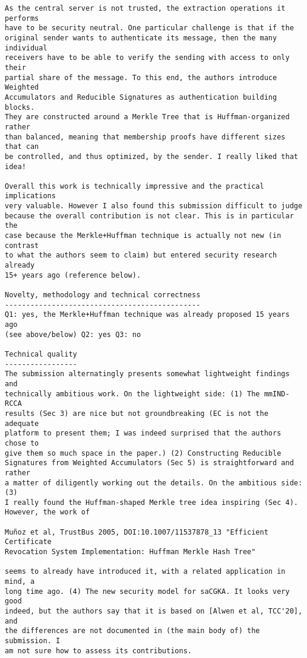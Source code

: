 \documentclass[letterpaper,10pt]{article}
\begin{document}
\begin{enumerate}[label=(\Alph*)]
\begin{verbatim}
As the central server is not trusted, the extraction operations it performs
have to be security neutral. One particular challenge is that if the
original sender wants to authenticate its message, then the many individual
receivers have to be able to verify the sending with access to only their
partial share of the message. To this end, the authors introduce Weighted
Accumulators and Reducible Signatures as authentication building blocks.
They are constructed around a Merkle Tree that is Huffman-organized rather
than balanced, meaning that membership proofs have different sizes that can
be controlled, and thus optimized, by the sender. I really liked that idea!

Overall this work is technically impressive and the practical implications
very valuable. However I also found this submission difficult to judge
because the overall contribution is not clear. This is in particular the
case because the Merkle+Huffman technique is actually not new (in contrast
to what the authors seem to claim) but entered security research already
15+ years ago (reference below).

Novelty, methodology and technical correctness
----------------------------------------------
Q1: yes, the Merkle+Huffman technique was already proposed 15 years ago
(see above/below) Q2: yes Q3: no

Technical quality
-----------------
The submission alternatingly presents somewhat lightweight findings and
technically ambitious work. On the lightweight side: (1) The mmIND-RCCA
results (Sec 3) are nice but not groundbreaking (EC is not the adequate
platform to present them; I was indeed surprised that the authors chose to
give them so much space in the paper.) (2) Constructing Reducible
Signatures from Weighted Accumulators (Sec 5) is straightforward and rather
a matter of diligently working out the details. On the ambitious side: (3)
I really found the Huffman-shaped Merkle tree idea inspiring (Sec 4).
However, the work of

Muñoz et al, TrustBus 2005, DOI:10.1007/11537878_13 "Efficient Certificate
Revocation System Implementation: Huffman Merkle Hash Tree"

seems to already have introduced it, with a related application in mind, a
long time ago. (4) The new security model for saCGKA. It looks very good
indeed, but the authors say that it is based on [Alwen et al, TCC'20], and
the differences are not documented in (the main body of) the submission. I
am not sure how to assess its contributions.



\end{verbatim}
\end{enumerate}
\end{document}
